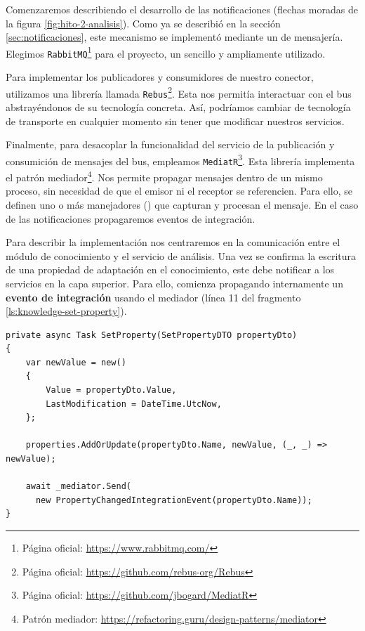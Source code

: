 Comenzaremos describiendo el desarrollo de las notificaciones (flechas moradas de la figura \ref{fig:hito-2-analisis}). Como ya se describió en la sección \ref{sec:notificaciones}, este mecanismo se implementó mediante un  de mensajería. Elegimos \texttt{RabbitMQ}\footnote{Página oficial: \url{https://www.rabbitmq.com/}} para el proyecto, un  sencillo y ampliamente utilizado. \cite{newmanBuildingMicroservicesDesigning2021}

Para implementar los publicadores y consumidores de nuestro conector, utilizamos una librería llamada \texttt{Rebus}\footnote{Página oficial: \url{https://github.com/rebus-org/Rebus}}. Esta nos permitía interactuar con el bus abstrayéndonos de su tecnología concreta. Así, podríamos cambiar de tecnología de transporte en cualquier momento sin tener que modificar nuestros servicios.

Finalmente, para desacoplar la funcionalidad del servicio de la publicación y consumición de mensajes del bus, empleamos \texttt{MediatR}\footnote{Página oficial: \url{https://github.com/jbogard/MediatR}}. Esta librería implementa el patrón mediador\footnote{Patrón mediador: \url{https://refactoring.guru/design-patterns/mediator}}. Nos permite propagar mensajes dentro de un mismo proceso, sin necesidad de que el emisor ni el receptor se referencien. Para ello, se definen uno o más manejadores () que capturan y procesan el mensaje. En el caso de las notificaciones propagaremos eventos de integración.

Para describir la implementación nos centraremos en la comunicación entre el módulo de conocimiento y el servicio de análisis. Una vez se confirma la escritura de una propiedad de adaptación en el conocimiento, este debe notificar a los servicios en la capa superior. Para ello, comienza propagando internamente un \textbf{evento de integración} usando el mediador (línea 11 del fragmento \ref{ls:knowledge-set-property}).

\begin{lstlisting}[language={[Sharp]C},caption={Implementación del método que asigna valor a una propiedad. Muestra un ejemplo de propagación interna de eventos de integración.},captionpos=b, label=ls:knowledge-set-property]
private async Task SetProperty(SetPropertyDTO propertyDto)
{
    var newValue = new()
    {
        Value = propertyDto.Value,
        LastModification = DateTime.UtcNow,
    };

    properties.AddOrUpdate(propertyDto.Name, newValue, (_, _) => newValue);

    await _mediator.Send(
      new PropertyChangedIntegrationEvent(propertyDto.Name));
}

\end{lstlisting}

